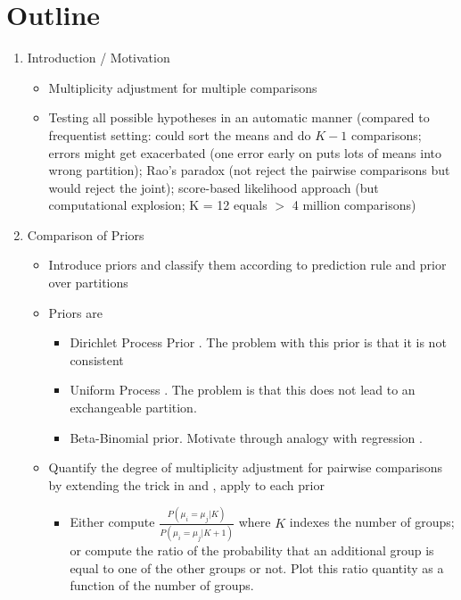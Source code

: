 \documentclass[11pt,a4paper]{article}
\theoremstyle{definition} %
\theoremstyle{case}
\begin{document}
\section*{Outline}
\begin{enumerate}
    \item Introduction / Motivation
    \begin{itemize}
        \item Multiplicity adjustment for multiple comparisons
        \item Testing all possible hypotheses in an automatic manner (compared to frequentist setting: could sort the means and do $K - 1$ comparisons; errors might get exacerbated (one error early on puts lots of means into wrong partition); Rao's paradox (not reject the pairwise comparisons but would reject the joint); score-based likelihood approach (but computational explosion; K = 12 equals $>$ 4 million comparisons)
    \end{itemize}
    \item Comparison of Priors
    \begin{itemize}
        \item Introduce priors and classify them according to prediction rule and prior over partitions
        \item Priors are
        \begin{itemize}
            \item Dirichlet Process Prior \parencite{gopalan1998bayesian}. The problem with this prior is that it is not consistent \parencite{miller2013simple, miller2018mixture}
            \item Uniform Process \parencite{wallach2010alternative}. The problem is that this does not lead to an exchangeable partition.
            \item Beta-Binomial prior. Motivate through analogy with regression \parencite{scott2006exploration, scott2010bayes}.
        \end{itemize}
        \item Quantify the degree of multiplicity adjustment for pairwise comparisons by extending the trick in \textcite{scott2010bayes} and \textcite{li2016role}, apply to each prior
        \begin{itemize}
            \item Either compute $\frac{P(\mu_i = \mu_j | K)}{P(\mu_i = \mu_j | K + 1)}$ where $K$ indexes the number of groups; or compute the ratio of the probability that an additional group is equal to one of the other groups or not. Plot this ratio quantity as a function of the number of groups.

\end{itemize}
\end{itemize}
\end{enumerate}
\end{document}
